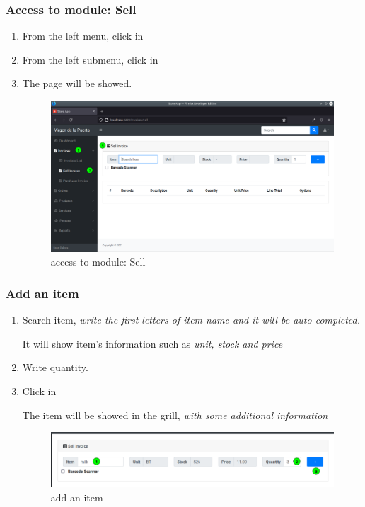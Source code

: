 \documentclass[a4paper,11pt]{refart}
\begin{document}
\subsubsection{Access to module: Sell}
\begin{enumerate}
	\item From the left menu, click in  
	\item From the left submenu, click in  
	\item The page will be showed.
	\begin{figure}[H]\centering
		\includegraphics[width=\textwidth]{images/invoice_sell-access}
		\caption{access to module: Sell}
		\label{fig:invoice_sell-access}
	\end{figure}
\end{enumerate}

\subsubsection{Add an item}
\begin{enumerate}
	\item Search item, \emph{write the first letters of item name and it will be auto-completed.}
	\medskip
	\begin{leftbar}
		It will show item's information such as \emph{ unit, stock and price}
	\end{leftbar}
	\item Write quantity.
	\item Click in \keys{\texttt{+}}
	\medskip
	\begin{leftbar}
		The item will be showed in the grill,  \emph{with some additional information}
	\end{leftbar}
	\begin{figure}[H]\centering
		\includegraphics[width=\textwidth]{images/invoice_sell-item}
		\caption{add an item}\label{fig:invoice_sell-item}
	\end{figure}
\end{enumerate}
\end{document}
